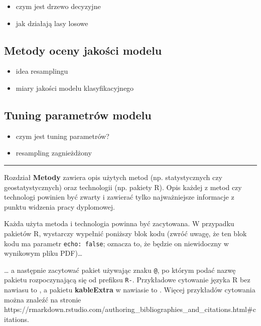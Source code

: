 \documentclass{amuthesis}
\begin{document}
\begin{itemize}
\item
  czym jest drzewo decyzyjne
\item
  jak działają lasy losowe
\end{itemize}

\hypertarget{sec-resampling}{%
\subsection{Metody oceny jakości modelu}\label{sec-resampling}}

\begin{itemize}
\item
  idea resamplingu
\item
  miary jakości modelu klasyfikacyjnego
\end{itemize}

\hypertarget{sec-tuning}{%
\subsection{Tuning parametrów modelu}\label{sec-tuning}}

\begin{itemize}
\item
  czym jest tuning parametrów?
\item
  resampling zagnieżdżony
\end{itemize}

\begin{center}\rule{0.5\linewidth}{0.5pt}\end{center}

Rozdział \textbf{Metody} zawiera opis użytych metod (np. statystycznych
czy geostatystycznych) oraz technologii (np. pakiety R). Opis każdej z
metod czy technologi powinien być zwarty i zawierać tylko najważniejsze
informacje z punktu widzenia pracy dyplomowej.

Każda użyta metoda i technologia powinna być zacytowana. W przypadku
pakietów R, wystarczy wypełnić poniższy blok kodu (zwróć uwagę, że ten
blok kodu ma parametr \texttt{echo:\ false}; oznacza to, że będzie on
niewidoczny w wynikowym pliku PDF)\ldots{}

\ldots{} a następnie zacytować pakiet używając znaku \texttt{@}, po
którym podać nazwę pakietu rozpoczynającą się od prefiksu \texttt{R-}.
Przykładowe cytowanie języka R bez nawiasu to \textcite{R-base}, a
pakietu \textbf{kableExtra} w nawiasie to \autocite{R-kableExtra}.
Więcej przykładów cytowania można znaleźć na stronie
https://rmarkdown.rstudio.com/authoring\_bibliographies\_and\_citations.html\#citations.
\end{document}
